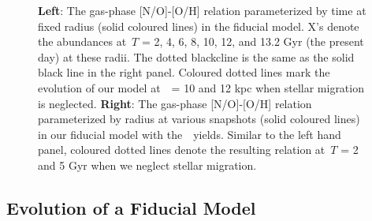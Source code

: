 \documentclass[ms.tex]{subfiles}
\begin{document}
\begin{figure}
\caption{
\textbf{Left}: The gas-phase [N/O]-[O/H] relation parameterized by time at 
fixed radius (solid coloured lines) in the fiducial model. 
X's denote the abundances at~$T$ = 2, 4, 6, 8, 10, 12, and 13.2 Gyr (the 
present day) at these radii. 
The dotted blackcline is the same as the solid black line in the right panel. 
Coloured dotted lines mark the evolution of our model at~\rgal~= 10 and 12 kpc 
when stellar migration is neglected. 
\textbf{Right}: The gas-phase [N/O]-[O/H] relation parameterized by radius at 
various snapshots (solid coloured lines) in our fiducial model with 
the~\cristallo~yields. 
Similar to the left hand panel, coloured dotted lines denote the resulting 
relation at~$T$ = 2 and 5 Gyr when we neglect stellar migration. 
} 
\label{fig:no_oh_timeevol} 
\end{figure} 

\subsection{Evolution of a Fiducial Model} 
\label{sec:results:fiducial} 
\end{document}
